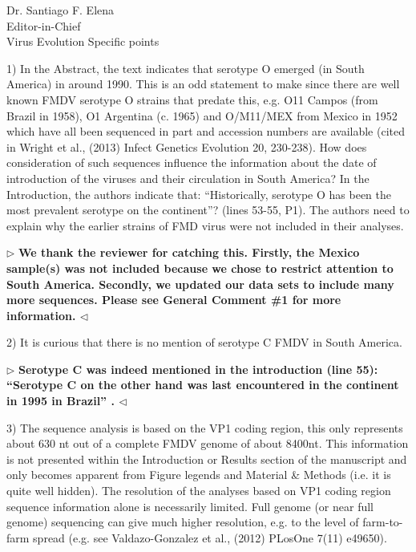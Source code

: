 \documentclass[12pt, a4paper]{letter} %
\newenvironment{reply}{$\triangleright$\bf}{$\triangleleft$}
\begin{document}
\begin{letter}{
	Dr. Santiago F. Elena\\
    Editor-in-Chief \\
    Virus Evolution
}
Specific points

1)      In the Abstract, the text indicates that serotype O emerged (in South America) in around 1990. 
This is an odd statement to make since there are well known FMDV serotype O strains that predate this, e.g. O11 Campos (from Brazil in 1958), O1 Argentina (c. 1965) and O/M11/MEX from Mexico in 1952 which have all been sequenced in part and accession numbers are available (cited in Wright et al., (2013) Infect Genetics Evolution 20, 230-238).  
How does consideration of such sequences influence the information about the date of introduction of the viruses and their circulation in South America? 
In the Introduction, the authors indicate that: ``Historically, serotype O has been the most prevalent serotype on the continent''? (lines 53-55, P1). 
The authors need to explain why the earlier strains of FMD virus were not included in their analyses.

\begin{reply}
We thank the reviewer for catching this.
Firstly, the Mexico sample(s) was not included because we chose to restrict attention to South America.
Secondly, we updated our data sets to include many more sequences.
Please see General Comment \#1 for more information.
\end{reply}

2)      It is curious that there is no mention of serotype C FMDV in South America.

\begin{reply}
Serotype C was indeed mentioned in the introduction (line 55): ``Serotype C on the other hand was last encountered in the continent in 1995 in Brazil'' .
\end{reply}

3)      The sequence analysis is based on the VP1 coding region, this only represents about 630 nt out of a complete FMDV genome of about 8400nt. 
This information is not presented within the Introduction or Results section of the manuscript and only becomes apparent from Figure legends and Material \& Methods (i.e. it is quite well hidden). 
The resolution of the analyses based on VP1 coding region sequence information alone is necessarily limited. 
Full genome (or near full genome) sequencing can give much higher resolution, e.g. to the level of farm-to-farm spread (e.g. see Valdazo-Gonzalez et al., (2012) PLosOne 7(11) e49650).


\end{letter}
\end{document}
